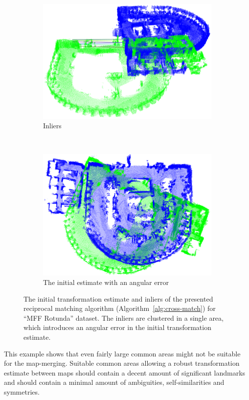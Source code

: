 \begin{figure}
    \centering
    \begin{subfigure}[b]{\textwidth}
        \includegraphics[width=\textwidth]{../img/mff_rotunda_matching_inliers.png}
        \caption{Inliers}
        \label{fig:mff_rotunda_matching_inliers}
    \end{subfigure}
    ~
    \begin{subfigure}[b]{\textwidth}
        \includegraphics[width=\textwidth]{../img/mff_rotunda_matching_estimate.png}
        \caption{The initial estimate with an angular error}
        \label{fig:mff_rotunda_matching_estimate}
    \end{subfigure}
    \caption[The initial estimate for ``MFF Rotunda '' dataset produced by the reciprocal matching]{The initial transformation estimate and inliers of the presented reciprocal matching algorithm (Algorithm~\ref{alg:cross-match}) for ``MFF Rotunda'' dataset. The inliers are clustered in a single area, which introduces an angular error in the initial transformation estimate.}
    \label{fig:mff_rotunda_matching}
\end{figure}

This example shows that even fairly large common areas might not be suitable for the map-merging. Suitable common areas allowing a robust transformation estimate between maps should contain a decent amount of significant landmarks and should contain a minimal amount of ambiguities, self-similarities and symmetries.
